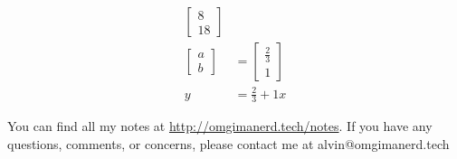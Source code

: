 \documentclass{math}
\begin{document}
\begin{align*}
\begin{bmatrix}
    8 \\ 18
  \end{bmatrix} \\
  \begin{bmatrix}
    a \\ b
  \end{bmatrix} &= \begin{bmatrix}
    \frac{2}{3} \\ 1
  \end{bmatrix} \\
  y &= \frac{2}{3}+1x
\end{align*}

\begin{center}
  You can find all my notes at \url{http://omgimanerd.tech/notes}. If you have
  any questions, comments, or concerns, please contact me at
  alvin@omgimanerd.tech
\end{center}
\end{document}
